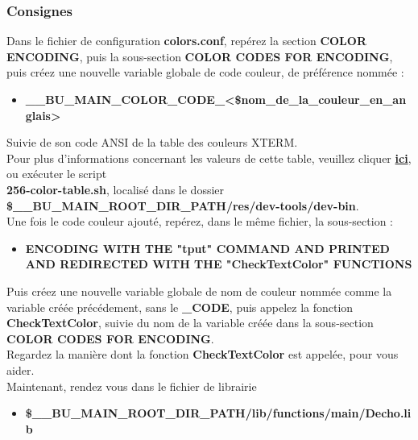 \documentclass[a4paper,10pt]{article}
\begin{document}
\color{blue}
\subsubsection{Consignes}\color{white}
Dans le fichier de configuration \textbf{\color{lime}colors.conf}, repérez la section \textbf{COLOR ENCODING}, puis la sous-section \textbf{COLOR CODES FOR ENCODING}, puis créez une nouvelle variable globale de code couleur, de préférence nommée :
\begin{itemize}
    \item \textbf{\color{orange}\_\_BU\_MAIN\_COLOR\_CODE\_<\$nom\_de\_la\_couleur\_en\_anglais>}\\[1\baselineskip]
\end{itemize}

Suivie de son code ANSI de la table des couleurs XTERM.\\[1\baselineskip]

Pour plus d'informations concernant les valeurs de cette table, veuillez cliquer \href{https://unix.stackexchange.com/questions/269077/tput-setaf-color-table-how-to-determine-color-codes/269085#269085}{\textbf{ici}}, ou exécuter le script\\
\textbf{\color{lime}256-color-table.sh}, localisé dans le dossier \textbf{\color{orange}\$\_\_BU\_MAIN\_ROOT\_DIR\_PATH\color{lime}/res/dev-tools/dev-bin}.\\[1\baselineskip]

Une fois le code couleur ajouté, repérez, dans le même fichier, la sous-section :\\
\begin{itemize}
    \item \textbf{ENCODING WITH THE "tput" COMMAND AND PRINTED AND REDIRECTED WITH THE "CheckTextColor" FUNCTIONS}\\[1\baselineskip]
\end{itemize}

Puis créez une nouvelle variable globale de nom de couleur nommée comme la variable créée précédement, sans le \textbf{\color{orange}\_CODE}, puis appelez la fonction \textbf{\color{mauve}CheckTextColor}, suivie du nom de la variable créée dans la sous-section \textbf{COLOR CODES FOR ENCODING}.\\[1\baselineskip]

Regardez la manière dont la fonction \textbf{\color{mauve}CheckTextColor} est appelée, pour vous aider.\\[1\baselineskip]


Maintenant, rendez vous dans le fichier de librairie
\begin{itemize}
    \item \textbf{\color{orange}\$\_\_BU\_MAIN\_ROOT\_DIR\_PATH\color{lime}/lib/functions/main/Decho.lib}\\[1\baselineskip]
\end{itemize}
\end{document}
